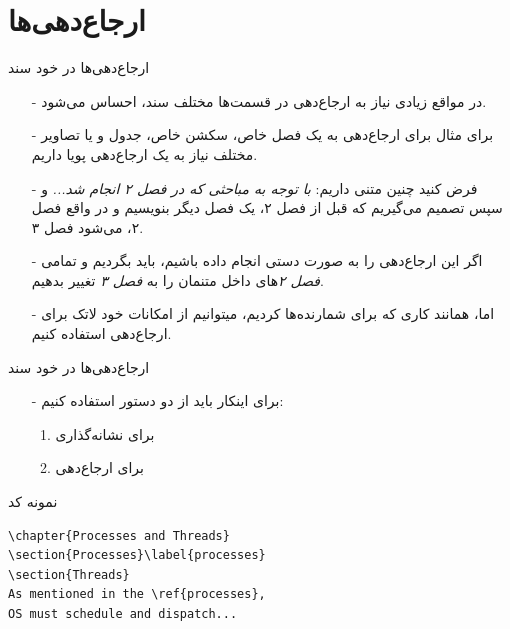 \section{ارجاع‌دهی‌‌ها}
\begin{frame}{ارجاع‌دهی‌‌ها در خود سند}
\begin{itemize}\itemr
\item[-]
در مواقع زیادی نیاز به ارجاع‌دهی در قسمت‌ها مختلف سند، احساس می‌شود.
\item[-]
برای مثال برای ارجاع‌دهی به یک فصل خاص، سکشن‌ خاص، جدول و یا تصاویر مختلف نیاز به یک ارجاع‌دهی پویا داریم.

\item[-]
فرض کنید چنین متنی داریم: \textit{با توجه به مباحثی که در فصل ۲ انجام شد...}
و سپس تصمیم می‌گیریم که قبل از فصل ۲، یک فصل دیگر بنویسیم و در واقع فصل ۲، می‌شود فصل ۳.

\item[-]
اگر این ارجاع‌دهی را به صورت دستی انجام داده باشیم، باید بگردیم و تمامی \textit{فصل ۲}‌های داخل متنمان را به \textit{فصل ۳} تغییر بدهیم.

\item[-]
اما، همانند کاری که برای شمارنده‌ها کردیم، میتوانیم از امکانات خود لاتک برای ارجاع‌دهی استفاده کنیم.
\end{itemize}
\end{frame}

\begin{frame}{ارجاع‌دهی‌‌ها در خود سند}
\begin{itemize}\itemr
\item[-]
برای اینکار باید از دو دستور استفاده کنیم:
\begin{enumerate}\itemr
\item 
{} 
برای نشانه‌گذاری

\item 
{}
برای ارجاع‌دهی 
\end{enumerate}
\end{itemize}
\end{frame}

\begin{frame}[fragile]{نمونه کد}
\begin{latin}
\begin{lstlisting}[keywords={chapter, section, label, ref}, keywordstyle=\color{Mulberry}\textbf]
\chapter{Processes and Threads}
\section{Processes}\label{processes}
\section{Threads}
As mentioned in the \ref{processes},
OS must schedule and dispatch...
\end{lstlisting}
\end{latin}
\end{frame}

